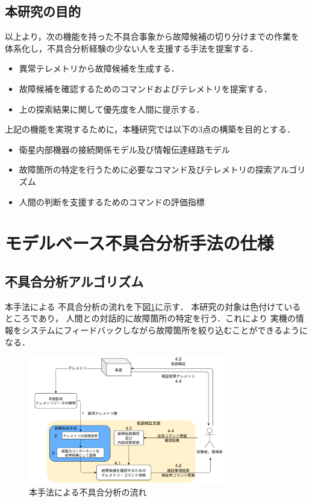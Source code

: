 \documentclass[11pt]{jsarticle}%
\begin{document}
\begin{multicols}{2}
\subsection{本研究の目的}
以上より，次の機能を持った不具合事象から故障候補の切り分けまでの作業を
体系化し，不具合分析経験の少ない人を支援する手法を提案する．
  \begin{itemize}
  \item 異常テレメトリから故障候補を生成する．
  \item 故障候補を確認するためのコマンドおよびテレメトリを提案する．
  \item 上の探索結果に関して優先度を人間に提示する．
\end{itemize}
上記の機能を実現するために，本種研究では以下の3点の構築を目的とする．%
\begin{itemize}
  \item 衛星内部機器の接続関係モデル及び情報伝達経路モデル
  \item 故障箇所の特定を行うために必要なコマンド及びテレメトリの探索アルゴリズム
  \item 人間の判断を支援するためのコマンドの評価指標
\end{itemize}
\vspace{-1zh}
\section{モデルベース不具合分析手法の仕様}
\vspace{-1zh}
\subsection{不具合分析アルゴリズム}
\vspace{-1zh}
本手法による
不具合分析の流れを下図\ref{fig:fault_diagnosis_flow}に示す．
本研究の対象は色付けているところであり，
人間との対話的に故障箇所の特定を行う．これにより %
実機の情報をシステムにフィードバックしながら故障箇所を絞り込むことができるようになる．
\begin{figure}[H]
  \centering
    \includegraphics[height=5.6cm]{../figure/fault_diagnosis_flow.png}
    \caption{本手法による不具合分析の流れ}
    \label{fig:fault_diagnosis_flow}
\end{figure}


\end{multicols}
\end{document}
